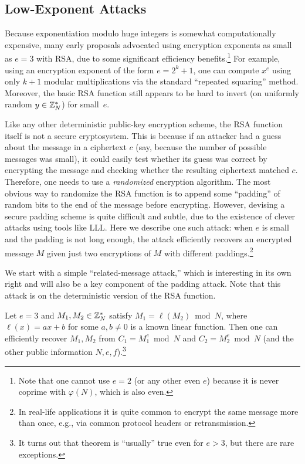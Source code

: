 \documentclass[11pt]{article}
\begin{document}
\subsection{Low-Exponent Attacks}
\label{sec:low-exponent-attacks}

Because exponentiation modulo huge integers is somewhat
computationally expensive, many early proposals advocated using
encryption exponents as small as $e=3$ with RSA, due to some
significant efficiency benefits.\footnote{Note that one cannot use
  $e=2$ (or any other even $e$) because it is never coprime with
  $\varphi(N)$, which is also even.} For example, using an encryption
exponent of the form $e=2^{k}+1$, one can compute $x^{e}$ using only
$k+1$ modular multiplications via the standard ``repeated squaring''
method.  Moreover, the basic RSA function still appears to be hard to
invert (on uniformly random $y \in \mathbb{Z}_{N}^{*}$) for small~$e$.

Like any other deterministic public-key encryption scheme, the RSA
function itself is not a secure cryptosystem.  This is because if an
attacker had a guess about the message in a ciphertext $c$ (say,
because the number of possible messages was small), it could easily
test whether its guess was correct by encrypting the message and
checking whether the resulting ciphertext matched $c$.  Therefore, one
needs to use a \emph{randomized} encryption algorithm.  The most
obvious way to randomize the RSA function is to append some
``padding'' of random bits to the end of the message before
encrypting.  However, devising a secure padding scheme is quite
difficult and subtle, due to the existence of clever attacks using
tools like LLL. Here we describe one such attack: when $e$ is small
and the padding is not long enough, the attack efficiently recovers an
encrypted message $M$ given just two encryptions of $M$ with different
paddings.\footnote{In real-life applications it is quite common to
  encrypt the same message more than once, e.g., via common protocol
  headers or retransmission.}

We start with a simple ``related-message attack,'' which is
interesting in its own right and will also be a key component of the
padding attack. Note that this attack is on the deterministic version
of the RSA function.

\begin{lemma}
  \label{lem:related-msg}
  Let $e=3$ and $M_1, M_2 \in \mathbb{Z}_{N}^*$ satisfy
  $M_1=\ell(M_2) \bmod N$, where $\ell(x)=ax+b$ for some $a,b\neq 0$
  is a known linear function. Then one can efficiently recover
  $M_1, M_2$ from $C_1=M_1^{e} \bmod N$ and $C_2=M_2^e \bmod N$ (and
  the other public information $N,e,f$).\footnote{It turns out that
    theorem is ``usually'' true even for $e>3$, but there are rare
    exceptions.}
\end{lemma}
\end{document}
